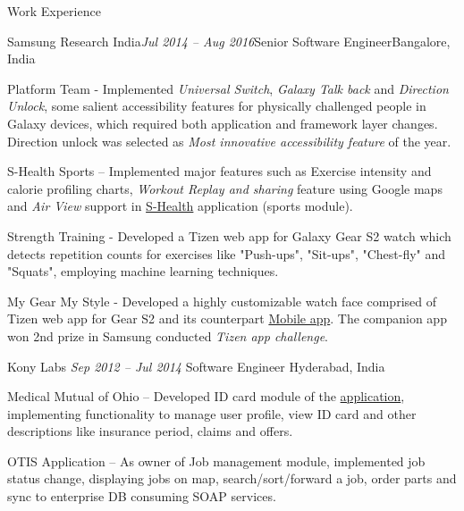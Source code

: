 \documentclass{resume} %
\begin{document}
\begin{rSection}{Work Experience}
\begin{rSubsection}{Samsung Research India}{\emph{Jul 2014 -- Aug 2016}}{Senior Software Engineer}{Bangalore, India}
\item Platform Team - Implemented {\emph{Universal Switch}}, {\emph{Galaxy Talk back}} and {\emph{Direction Unlock}}, some salient accessibility features for physically challenged people in Galaxy devices, which required both application and framework layer changes. Direction unlock was selected as {\emph{Most innovative accessibility feature}} of the year.
\item S-Health Sports -- Implemented major features such as Exercise intensity and calorie profiling charts, {\emph{Workout Replay and sharing}} feature using Google maps and {\emph{Air View}} support in \href{https://play.google.com/store/apps/details?id=com.sec.android.app.shealth&hl=en}{S-Health} application (sports module).
\item Strength Training - Developed a Tizen web app for Galaxy Gear S2 watch which detects repetition counts for exercises like "Push-ups", "Sit-ups", "Chest-fly" and "Squats", employing machine learning techniques.
\item My Gear My Style - Developed a highly customizable watch face comprised of Tizen web app for Gear S2 and its counterpart \href{https://play.google.com/store/apps/details?id=com.samsung.mygearmystyle&hl=en}{Mobile app}. The companion app won 2nd prize in Samsung conducted {\emph{Tizen app challenge}}.
\end{rSubsection}


\begin{rSubsection}{Kony Labs} {\emph{Sep 2012 -- Jul 2014}} {Software Engineer}
{Hyderabad, India}
\item Medical Mutual of Ohio -- Developed ID card module of the \href{https://play.google.com/store/apps/details?id=com.medmutual.mhp&hl=en} {application}, implementing functionality to manage user profile, view ID card and other descriptions like insurance period, claims and offers.
\item OTIS Application -- As owner of Job management module, implemented job status change, displaying jobs on map, search/sort/forward a job, order parts and sync to enterprise DB consuming SOAP services.
\newline
\end{rSubsection}


\end{rSection}
\end{document}
